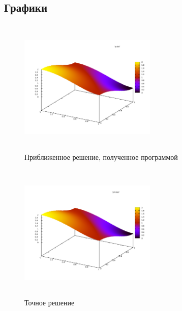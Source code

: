 \documentclass [12pt, a4paper] {article}
\begin{document}
\newpage
\subsection{Графики}
\begin{figure}[h]
    \centering
    \includegraphics[height=185pt, width=185pt]{p.pdf}
    \caption{Приближенное решение, полученное программой}
\end{figure}
\begin{figure}[h]
    \centering
    \includegraphics[height=185pt, width=185pt]{phi.pdf}
    \caption{Точное решение}
\end{figure}
\end{document}
